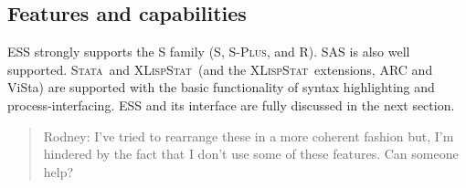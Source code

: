 \documentclass{article}
\newcommand*{\SAS}{\textsc{SAS}{\textregistered} }
\newcommand*{\Splus}{\textsc{S-Plus}}
\newcommand*{\XLispStat}{\textsc{XLispStat}}
\newcommand*{\Stata}{\textsc{Stata}}
\newcommand{\stexttt}[1]{{\small\texttt{#1}}}
\begin{document}





\subsection{Features and capabilities}
\label{sec:ESS:features}


ESS strongly supports the S family (S, \Splus, and R).
\SAS is also well supported.  \Stata\
and \XLispStat\ (and the \XLispStat\ extensions, ARC and ViSta) are
supported with the basic functionality of syntax highlighting and
process-interfacing.  ESS and its interface are fully discussed in the
next section.

\begin{quote}
 Rodney:  I've tried to rearrange these in a more coherent fashion
but, I'm hindered by the fact that I don't use some of these
features.  Can someone help?
\end{quote}
\end{document}
